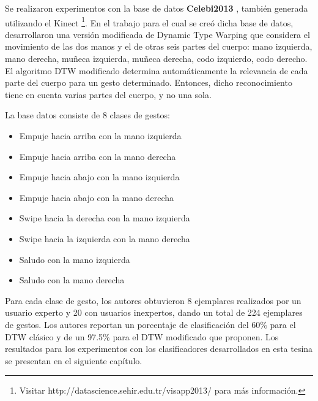 
Se realizaron experimentos con la base de datos \textbf{Celebi2013} \cite{celebi2013}, también generada utilizando el Kinect \footnote{Visitar http://datascience.sehir.edu.tr/visapp2013/ para más información.}. En el trabajo para el cual se creó dicha base de datos, desarrollaron una versión modificada de Dynamic Type Warping que considera el movimiento de las dos manos y el de otras seis partes del cuerpo: mano izquierda,  mano derecha, muñeca izquierda, muñeca derecha, codo izquierdo, codo derecho. El algoritmo DTW modificado determina automáticamente la relevancia de cada parte del cuerpo para un gesto determinado. Entonces, dicho reconocimiento tiene en cuenta varias partes del cuerpo, y no una sola. 

La base datos consiste de 8 clases de gestos:


\begin{itemize}
\item Empuje hacia arriba con la mano izquierda
\item Empuje hacia arriba con la mano derecha

\item Empuje hacia abajo con la mano izquierda
\item Empuje hacia abajo con la mano derecha

\item Swipe hacia la derecha con la mano izquierda
\item Swipe hacia la izquierda con la mano derecha

\item Saludo con la mano izquierda
\item Saludo con la mano derecha
\end{itemize}


Para cada clase de gesto, los autores obtuvieron 8 ejemplares realizados por un usuario experto y 20 con usuarios inexpertos, dando un total de  224 ejemplares de gestos. Los autores reportan un porcentaje de clasificación del 60\% para el DTW clásico y de un 97.5\% para el DTW modificado que proponen. Los resultados para los experimentos con los clasificadores desarrollados en esta tesina se presentan en el siguiente capítulo.



